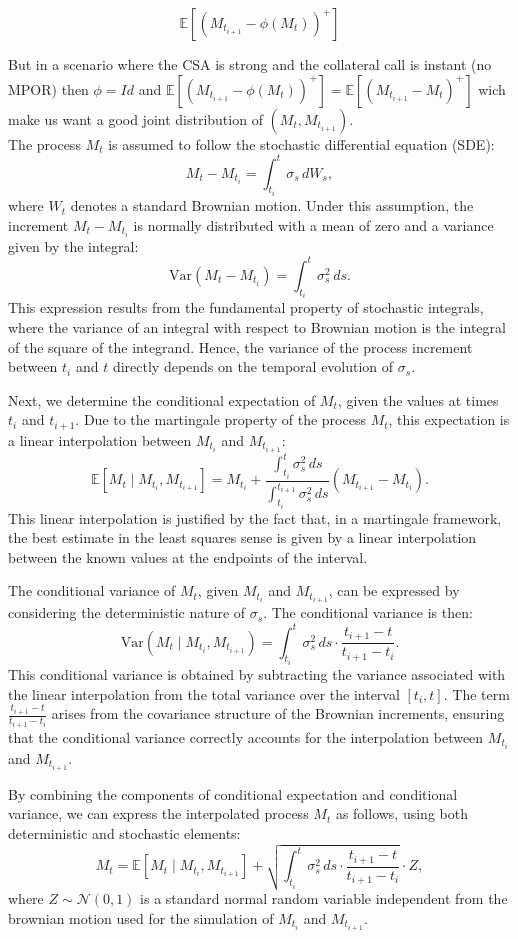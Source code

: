 \documentclass{article}
\begin{document}
$$\mathbb{E}[(M_{t_{i+1}} - \phi(M_t))^+]$$

But in a scenario where the CSA is strong and the collateral call is instant (no MPOR) then $\phi = Id$ and $\mathbb{E}[(M_{t_{i+1}} - \phi(M_t))^+] = \mathbb{E}[(M_{t_{i+1}} - M_t)^+]$ wich make us want a good joint distribution of $(M_t, M_{t_{i+1}})$.\\

The process $M_t$ is assumed to follow the stochastic differential equation (SDE):
\[
M_t - M_{t_i} = \int_{t_i}^t \sigma_s \, dW_s,
\]
where $W_t$ denotes a standard Brownian motion. Under this assumption, the increment $M_t - M_{t_i}$ is normally distributed with a mean of zero and a variance given by the integral:
\[
\text{Var}(M_t - M_{t_i}) = \int_{t_i}^t \sigma_s^2 \, ds.
\]
This expression results from the fundamental property of stochastic integrals, where the variance of an integral with respect to Brownian motion is the integral of the square of the integrand. Hence, the variance of the process increment between $t_i$ and $t$ directly depends on the temporal evolution of $\sigma_s$.

Next, we determine the conditional expectation of $M_t$, given the values at times $t_i$ and $t_{i+1}$. Due to the martingale property of the process $M_t$, this expectation is a linear interpolation between $M_{t_i}$ and $M_{t_{i+1}}$:
\[
\mathbb{E}[M_t \mid M_{t_i}, M_{t_{i+1}}] = M_{t_i} + \frac{\int_{t_i}^t \sigma_s^2 \, ds}{\int_{t_i}^{t_{i+1}} \sigma_s^2 \, ds} \left(M_{t_{i+1}} - M_{t_i}\right).
\]
This linear interpolation is justified by the fact that, in a martingale framework, the best estimate in the least squares sense is given by a linear interpolation between the known values at the endpoints of the interval.

The conditional variance of $M_t$, given $M_{t_i}$ and $M_{t_{i+1}}$, can be expressed by considering the deterministic nature of $\sigma_s$. The conditional variance is then:
\[
\text{Var}(M_t \mid M_{t_i}, M_{t_{i+1}}) = \int_{t_i}^t \sigma_s^2 \, ds \cdot \frac{t_{i+1} - t}{t_{i+1} - t_i}.
\]
This conditional variance is obtained by subtracting the variance associated with the linear interpolation from the total variance over the interval $[t_i, t]$. The term $\frac{t_{i+1} - t}{t_{i+1} - t_i}$ arises from the covariance structure of the Brownian increments, ensuring that the conditional variance correctly accounts for the interpolation between $M_{t_i}$ and $M_{t_{i+1}}$.

By combining the components of conditional expectation and conditional variance, we can express the interpolated process $M_t$ as follows, using both deterministic and stochastic elements:
\[
M_t = \mathbb{E}[M_t \mid M_{t_i}, M_{t_{i+1}}] + \sqrt{\int_{t_i}^t \sigma_s^2 \, ds \cdot \frac{t_{i+1} - t}{t_{i+1} - t_i}} \cdot Z,
\]
where $Z \sim \mathcal{N}(0, 1)$ is a standard normal random variable independent from the brownian motion used for the simulation of $M_{t_i}$ and $M_{t_{i+1}}$.
\end{document}
